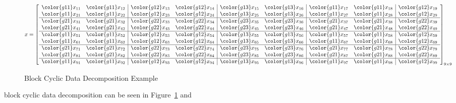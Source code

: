 \begin{figure}[h]
\begin{align*}
x &= \left[
      \begin{array}{ll|ll|ll|ll|l}
      \color{g11}x_{11} & \color{g11}x_{12} & \color{g12}x_{13} & \color{g12}x_{14} & \color{g13}x_{15} & \color{g13}x_{16} & \color{g11}x_{17} & \color{g11}x_{18} & \color{g12}x_{19}\\
      \color{g11}x_{21} & \color{g11}x_{22} & \color{g12}x_{23} & \color{g12}x_{24} & \color{g13}x_{25} & \color{g13}x_{26} & \color{g11}x_{27} & \color{g11}x_{28} & \color{g12}x_{29}\\\hline
      \color{g21}x_{31} & \color{g21}x_{32} & \color{g22}x_{33} & \color{g22}x_{34} & \color{g23}x_{35} & \color{g23}x_{36} & \color{g21}x_{37} & \color{g21}x_{38} & \color{g22}x_{39}\\
      \color{g21}x_{41} & \color{g21}x_{42} & \color{g22}x_{43} & \color{g22}x_{44} & \color{g23}x_{45} & \color{g23}x_{46} & \color{g21}x_{47} & \color{g21}x_{48} & \color{g22}x_{49}\\\hline
      \color{g11}x_{51} & \color{g11}x_{52} & \color{g12}x_{53} & \color{g12}x_{54} & \color{g13}x_{55} & \color{g13}x_{56} & \color{g11}x_{57} & \color{g11}x_{58} & \color{g12}x_{59}\\
      \color{g11}x_{61} & \color{g11}x_{62} & \color{g12}x_{63} & \color{g12}x_{64} & \color{g13}x_{65} & \color{g13}x_{66} & \color{g11}x_{67} & \color{g11}x_{68} & \color{g12}x_{69}\\\hline
      \color{g21}x_{71} & \color{g21}x_{72} & \color{g22}x_{73} & \color{g22}x_{74} & \color{g23}x_{75} & \color{g23}x_{76} & \color{g21}x_{77} & \color{g21}x_{78} & \color{g22}x_{79}\\
      \color{g21}x_{81} & \color{g21}x_{82} & \color{g22}x_{83} & \color{g22}x_{84} & \color{g23}x_{85} & \color{g23}x_{86} & \color{g21}x_{87} & \color{g21}x_{88} & \color{g22}x_{89}\\\hline
      \color{g11}x_{91} & \color{g11}x_{92} & \color{g12}x_{93} & \color{g12}x_{94} & \color{g13}x_{95} & \color{g13}x_{96} & \color{g11}x_{97} & \color{g11}x_{98} & \color{g12}x_{99}\\
      \end{array}
\right]_{9\times 9}
\end{align*}
\caption{Block Cyclic Data Decomposition Example}\label{fig:blockcyclic}
\end{figure}
block cyclic data decomposition can be seen in Figure~\ref{fig:blockcyclic} and 
